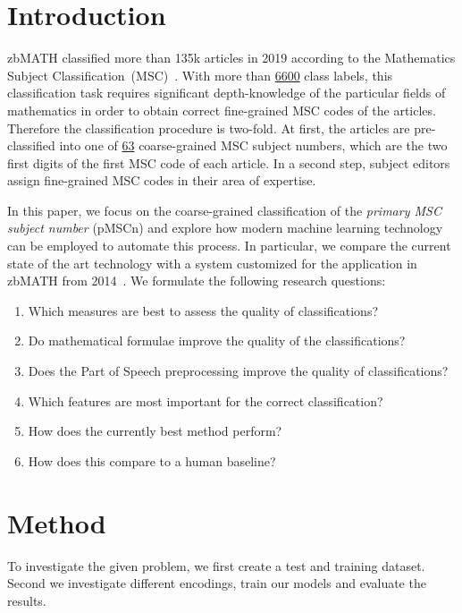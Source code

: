 \section{Introduction}\label{sec:intro}
zbMATH classified more than 135k articles in 2019 according to the Mathematics Subject Classification~(MSC)~\cite{Khnemund2016}.
With more than
\href{https://zbmath.org/classification/}%
{6600} class labels, this classification task requires significant depth-knowledge of the particular fields of mathematics in order to obtain correct fine-grained MSC codes of the articles.
Therefore the classification procedure is two-fold.
At first, the articles are pre-classified into one of \href{https://msc2020.org}%
{63} coarse-grained MSC subject numbers, which are the two first digits of the first MSC code of each article.
In a second step, subject editors assign fine-grained MSC codes in their area of expertise.

In this paper, we focus on the coarse-grained classification of the \emph{primary MSC subject number} (pMSCn) and explore how modern machine learning technology can be employed to automate this process.
In particular, we compare the current state of the art technology with a system customized for the application in zbMATH from 2014~\cite{SchonebergS14}.
We formulate the following research questions:
\begin{enumerate}
  \item Which measures are best to assess the quality of classifications?
  \item Do mathematical formulae improve the quality of the classifications?
  \item Does the Part of Speech preprocessing improve the quality of classifications?
  \item Which features are most important for the correct classification?
  \item How does the currently best method perform?
  \item How does this compare to a human baseline?
\end{enumerate}
\section{Method}\label{sec:method}


To investigate the given problem, we first create a test and training dataset.
Second we investigate different encodings, train our models and evaluate the results.
